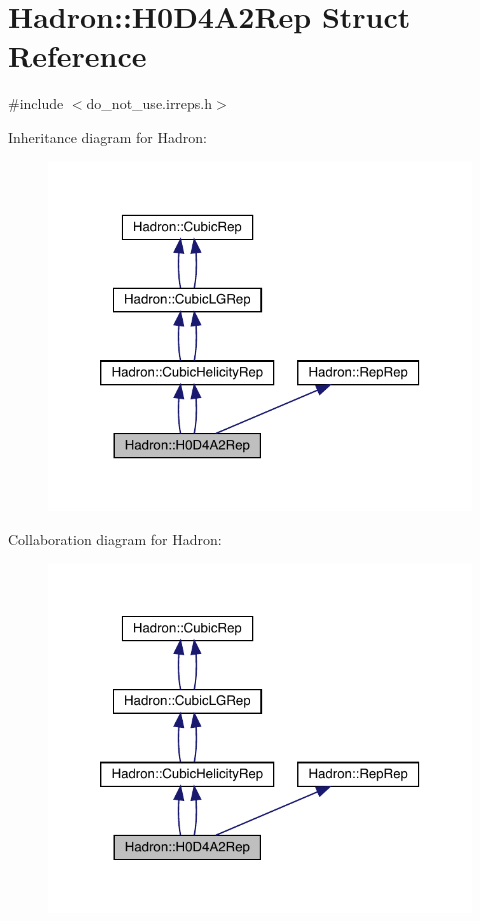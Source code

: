 \hypertarget{structHadron_1_1H0D4A2Rep}{}\section{Hadron\+:\+:H0\+D4\+A2\+Rep Struct Reference}
\label{structHadron_1_1H0D4A2Rep}


{\ttfamily \#include $<$do\+\_\+not\+\_\+use.\+irreps.\+h$>$}



Inheritance diagram for Hadron\+:\nopagebreak
\begin{figure}[H]
\begin{center}
\leavevmode
\includegraphics[width=320pt]{dd/d8a/structHadron_1_1H0D4A2Rep__inherit__graph}
\end{center}
\end{figure}


Collaboration diagram for Hadron\+:\nopagebreak
\begin{figure}[H]
\begin{center}
\leavevmode
\includegraphics[width=320pt]{da/d42/structHadron_1_1H0D4A2Rep__coll__graph}
\end{center}
\end{figure}
